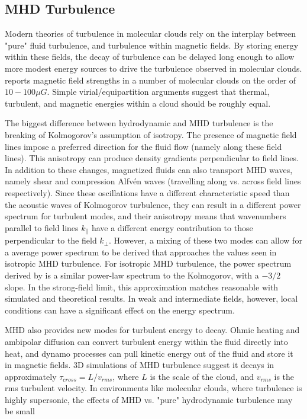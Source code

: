 \documentclass[12pt, preprint]{aastex}
\begin{document}
\subsection{MHD Turbulence}
Modern theories of turbulence in molecular clouds rely on the interplay between
"pure" fluid turbulence, and turbulence within magnetic fields.  By storing
energy within these fields, the decay of turbulence can be delayed long enough
to allow more modest energy sources to drive the turbulence observed in
molecular clouds.  \citet{shu1987} reports magnetic field strengths in a number
of molecular clouds on the order of $10-100 \mu G$.  Simple virial/equipartition
arguments suggest that thermal, turbulent, and magnetic energies within a cloud
should be roughly equal.

The biggest difference between hydrodynamic and MHD turbulence is the breaking
of Kolmogorov's assumption of isotropy.  The presence of magnetic field lines
impose a preferred direction for the fluid flow (namely along these field
lines).  This anisotropy can produce density gradients perpendicular to field
lines.  In addition to these changes, magnetized fluids can also transport MHD
waves, namely shear and compression Alfv\'{e}n waves (travelling along vs.
across field lines respectively).  Since these oscillations have a different
characteristic speed than the acoustic waves of Kolmogorov turbulence, they can
result in a different power spectrum for turbulent modes, and their anisotropy
means that wavenumbers parallel to field lines $k_\parallel$ have a different
energy contribution to those perpendicular to the field $k_\perp$.  However, a
mixing of these two modes can allow for a average power spectrum to be derived
that approaches the values seen in isotropic MHD turbulence.  For
isotropic MHD turbulence, the power spectrum derived by \citet{irosh1964} is a
similar power-law spectrum to the Kolmogorov, with a $-3/2$ slope.  In the
strong-field limit, this approximation matches reasonable with simulated and
theoretical results.  In weak and intermediate fields, however, local conditions
can have a significant effect on the energy spectrum.  

MHD also provides new modes for turbulent energy to decay.  Ohmic heating and
ambipolar diffusion can convert turbulent energy within the fluid directly into
heat, and dynamo processes can pull kinetic energy out of the fluid and store it
in magnetic fields.  3D simulations of MHD turbulence suggest it decays in
approximately $\tau_{cross} = L/v_{rms}$, where $L$ is the scale of the cloud,
and $v_{rms}$ is the rms turbulent velocity. In environments like molecular
clouds, where turbulence is highly supersonic, the effects of MHD vs. "pure"
hydrodynamic turbulence may be small \citep{elm2004}
\end{document}
